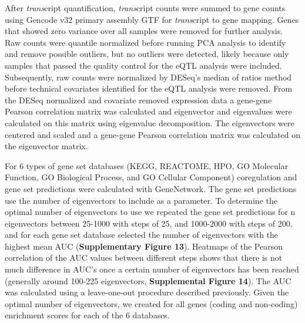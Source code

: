 {After \emph{trans}cript quantification, \emph{trans}cript counts were summed to gene counts using Gencode\cite{frankishGENCODEReferenceAnnotation2019} v32 primary assembly GTF for \emph{trans}cript to gene mapping.  Genes that showed zero variance over all samples were removed for further analysis. Raw counts were quantile normalized before running PCA analysis to identify and remove possible outliers, but no outliers were detected, likely because only samples that passed the quality control for the eQTL analysis were included. Subsequently, raw counts were normalized by DESeq’s\cite{loveModeratedEstimationFold2014} median of ratios method before technical covariates identified for the eQTL analysis were removed. From the DESeq\cite{loveModeratedEstimationFold2014} normalized and covariate removed expression data a gene-gene Pearson correlation matrix was calculated and eigenvector and eigenvalues were calculated on this matrix using eigenvalue decomposition. The eigenvectors were centered and scaled and a gene-gene Pearson correlation matrix was calculated on the eigenvector matrix. 

For 6 types of gene set databases (KEGG, REACTOME, HPO, GO Molecular Function, GO Biological Process, and GO Cellular Component) coregulation and gene set predictions were calculated with GeneNetwork. The gene set predictions use the number of eigenvectors to include as a parameter. To determine the optimal number of eigenvectors to use we repeated the gene set predictions for n eigenvectors between 25-1000 with steps of 25, and 1000-2000 with steps of 200, and for each gene set database selected the number of eigenvectors with the highest mean AUC (\textbf{Supplementary Figure 13}). Heatmaps of the Pearson correlation of the AUC values between different steps shows that there is not much difference in AUC’s once a certain number of eigenvectors has been reached (generally around 100-225 eigenvectors, \textbf{Supplemental Figure 14}). The AUC was calculated using a leave-one-out procedure described previously\cite{jassalReactomePathwayKnowledgebase2020}. Given the optimal number of eigenvectors, we created for all genes (coding and non-coding) enrichment scores for each of the 6 databases. 

}
